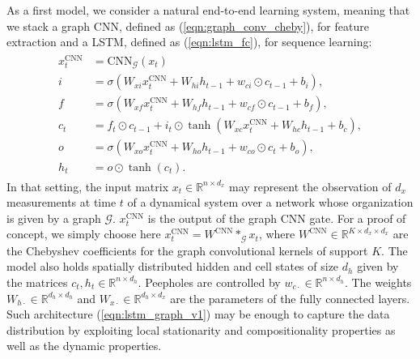 \documentclass{article} %
\newcommand{\R}{\mathbb{R}}
\newcommand{\G}{\mathcal{G}}
\newcommand{\eqnref}[1]{(\ref{eqn:#1})}
\begin{document}
As a first model, we consider a natural end-to-end learning system, meaning that we stack a graph CNN, defined as
\eqnref{graph_conv_cheby}, for feature extraction and a LSTM, defined as \eqnref{lstm_fc}, for sequence learning: \begin{align} \label{eqn:lstm_graph_v1}
\begin{split}
	x_t^{\textrm{CNN}} &=  \textrm{CNN}_\G(x_t)\\
	i &= \sigma(W_{xi} x_t^{\textrm{CNN}} + W_{hi} h_{t-1}  +
	            w_{ci} \odot c_{t-1} + b_i), \\
	f &= \sigma(W_{xf} x_t^{\textrm{CNN}} + W_{hf} h_{t-1} + w_{cf} \odot c_{t-1} + b_f), \\
	c_t &= f_t \odot c_{t-1} + i_t \odot \tanh(W_{xc} x_t^{\textrm{CNN}} + W_{hc} h_{t-1} + b_c), \\
	o &= \sigma(W_{xo} x_t^{\textrm{CNN}} + W_{ho} h_{t-1} + w_{co} \odot c_t + b_o), \\
	h_t &= o \odot \tanh(c_t).
\end{split}
\end{align}
In that setting, the input matrix $x_t \in \R^{n \times d_x}$ may represent the
observation of $d_x$ measurements at time $t$ of a dynamical system over a
network whose organization is given by a graph $\G$. $x_t^{\textrm{CNN}}$ is the output of the graph CNN gate. For a proof of concept, we simply choose here $x_t^{\textrm{CNN}} = W^{\textrm{CNN}} \ast_\G x_t$, where $W^{\textrm{CNN}} \in \R^{K \times d_x \times d_x}$ are the Chebyshev coefficients  for the graph convolutional kernels of support $K$. The model also holds spatially distributed hidden and cell states of size $d_h$ given by the matrices $c_t, h_t \in \R^{n \times d_h}$. Peepholes are controlled by $w_{c\cdot} \in \R^{n \times d_h}$. The weights $W_{h\cdot} \in
\R^{ d_h \times d_h}$ and $W_{x\cdot} \in \R^{d_h \times d_x}$ are the parameters of the fully connected layers.  Such architecture \eqnref{lstm_graph_v1} may be enough to capture the data distribution by exploiting local stationarity and compositionality properties as well as the dynamic properties.
\end{document}
